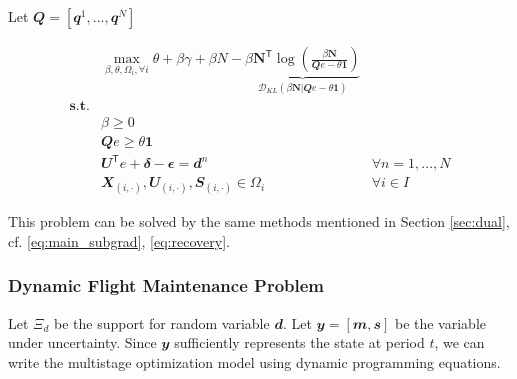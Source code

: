 \documentclass[../main]{subfiles}
\begin{document}
Let \(\mathbfit Q = [\mathbfit{q}^1, ..., \mathbfit{q}^N]\)

\[\begin{aligned}
     & \max_{\beta, \theta, \Omega_i, \forall i} \theta + \beta \gamma +  \beta N - \underbrace{\beta \mathbf N^\mathsf{T} \log(\frac{\beta \mathbf N}{\mathbfit{Q} e-\theta \mathbf 1})}_{\mathcal D_{KL}(\beta \mathbf N | \mathbfit{Q} e-\theta \mathbf 1)}                         \\
    \textbf {s.t.}                                                                                                                                                                                                                                                                     \\
     & \beta \ge 0                                                                                                                                                                                                                                                                     \\
     & \mathbfit{Q} e \ge \theta \mathbf 1                                                                                                                                                                                                                                             \\
     & \mathbfit{U} ^\mathsf{T} e + \mathbfit \delta - \mathbfit\epsilon  = \mathbfit d^n                                                                                                                                                                      & \forall n = 1, ..., N \\
     & \mathbfit X_{(i,\cdot)}, \mathbfit U_{(i,\cdot)}, \mathbfit S_{(i,\cdot)} \in \Omega_i                                                                                                                                                                  & \forall i\in I
  \end{aligned}\]

This problem can be solved by the same methods mentioned in Section \ref{sec:dual}, cf. \eqref{eq:main_subgrad}, \eqref{eq:recovery}.

\subsubsection{Dynamic Flight Maintenance Problem}\label{sec.dynamic_fmp}

Let \(\Xi_d\) be the support for random variable \(\mathbfit{d}\). Let
\(\mathbfit y = \left[\mathbfit m,\mathbfit s \right]\) be the
variable under uncertainty. Since \(\mathbfit y\) sufficiently
represents the state at period \(t\), we can write the multistage
optimization model using dynamic programming equations.
\end{document}
